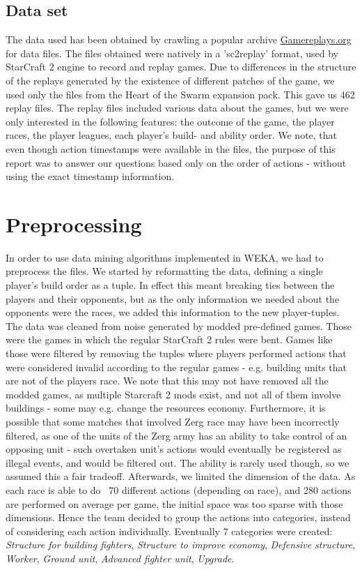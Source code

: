 \documentclass[a4paper,11pt]{article}
\begin{document}
\subsection{Data set}
The data used has been obtained by crawling a popular archive \url{Gamereplays.org} for data files.
The files obtained were natively in a 'sc2replay' format, used by StarCraft 2 engine to record and replay games. Due to differences in the structure of the replays generated by the existence of different patches of the game, we used only the files from the Heart of the Swarm expansion pack. This gave us 462 replay files. The replay files included various data about the games, but we were only interested in the following features: the outcome of the game, the player races, the player leagues, each player’s build- and ability order.
We note, that even though action timestamps were available in the files, the purpose of this report was to answer our questions based only on the order of actions - without using the exact timestamp information.


\section{Preprocessing}
\label{sec:preprocessing}
In order to use data mining algorithms implemented in WEKA, we had to preprocess the files. We started by reformatting the data, defining a single player’s build order as a tuple.
In effect this meant breaking ties between the players and their opponents, but as the only information we needed about the opponents were the races, we added this information to the new player-tuples.
The data was cleaned from noise generated by modded pre-defined games. Those were the games in which the regular StarCraft 2 rules were bent. Games like those were filtered by removing the tuples where players performed actions that were considered invalid according to the regular games - e.g. building units that are not of the players race. We note that this may not have removed all the modded games, as multiple Starcraft 2 mods exist, and not all of them involve buildings - some may e.g. change the resources economy. Furthermore, it is possible that some matches that involved Zerg race may have been incorrectly filtered, as one of the units of the Zerg army has an ability to take control of an opposing unit - such overtaken unit’s actions would eventually be registered as illegal events, and would be filtered out. The ability is rarely used though, so we assumed this a fair tradeoff.
Afterwards, we limited the dimension of the data. As each race is able to do ~70 different actions (depending on race), and 280 actions are performed on average per game, the initial space was too sparse with those dimensions. Hence the team decided to group the actions into categories, instead of considering each action individually. Eventually 7 categories were created: \textit{Structure for building fighters}, \textit{Structure to improve economy}, \textit{Defensive structure}, \textit{Worker}, \textit{Ground unit}, \textit{Advanced fighter unit}, \textit{Upgrade}.
\end{document}
